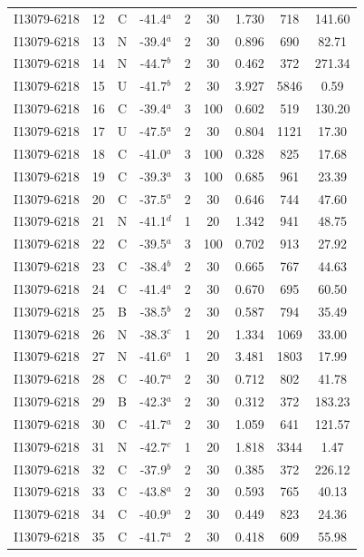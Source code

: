\begin{table}
\begin{tabular}{ccccccccc}
I13079-6218 & 12 & C & -41.4$^{a}$ & 2 & 30 & 1.730 & 718 & 141.60 \\
I13079-6218 & 13 & N & -39.4$^{a}$ & 2 & 30 & 0.896 & 690 & 82.71 \\
I13079-6218 & 14 & N & -44.7$^{b}$ & 2 & 30 & 0.462 & 372 & 271.34 \\
I13079-6218 & 15 & U & -41.7$^{b}$ & 2 & 30 & 3.927 & 5846 & 0.59 \\
I13079-6218 & 16 & C & -39.4$^{a}$ & 3 & 100 & 0.602 & 519 & 130.20 \\
I13079-6218 & 17 & U & -47.5$^{a}$ & 2 & 30 & 0.804 & 1121 & 17.30 \\
I13079-6218 & 18 & C & -41.0$^{a}$ & 3 & 100 & 0.328 & 825 & 17.68 \\
I13079-6218 & 19 & C & -39.3$^{a}$ & 3 & 100 & 0.685 & 961 & 23.39 \\
I13079-6218 & 20 & C & -37.5$^{a}$ & 2 & 30 & 0.646 & 744 & 47.60 \\
I13079-6218 & 21 & N & -41.1$^{d}$ & 1 & 20 & 1.342 & 941 & 48.75 \\
I13079-6218 & 22 & C & -39.5$^{a}$ & 3 & 100 & 0.702 & 913 & 27.92 \\
I13079-6218 & 23 & C & -38.4$^{b}$ & 2 & 30 & 0.665 & 767 & 44.63 \\
I13079-6218 & 24 & C & -41.4$^{a}$ & 2 & 30 & 0.670 & 695 & 60.50 \\
I13079-6218 & 25 & B & -38.5$^{b}$ & 2 & 30 & 0.587 & 794 & 35.49 \\
I13079-6218 & 26 & N & -38.3$^{c}$ & 1 & 20 & 1.334 & 1069 & 33.00 \\
I13079-6218 & 27 & N & -41.6$^{a}$ & 1 & 20 & 3.481 & 1803 & 17.99 \\
I13079-6218 & 28 & C & -40.7$^{a}$ & 2 & 30 & 0.712 & 802 & 41.78 \\
I13079-6218 & 29 & B & -42.3$^{a}$ & 2 & 30 & 0.312 & 372 & 183.23 \\
I13079-6218 & 30 & C & -41.7$^{a}$ & 2 & 30 & 1.059 & 641 & 121.57 \\
I13079-6218 & 31 & N & -42.7$^{c}$ & 1 & 20 & 1.818 & 3344 & 1.47 \\
I13079-6218 & 32 & C & -37.9$^{b}$ & 2 & 30 & 0.385 & 372 & 226.12 \\
I13079-6218 & 33 & C & -43.8$^{a}$ & 2 & 30 & 0.593 & 765 & 40.13 \\
I13079-6218 & 34 & C & -40.9$^{a}$ & 2 & 30 & 0.449 & 823 & 24.36 \\
I13079-6218 & 35 & C & -41.7$^{a}$ & 2 & 30 & 0.418 & 609 & 55.98 \\

\end{tabular}
\end{table}

